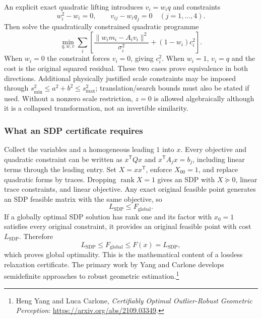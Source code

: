 \documentclass[11pt,a4paper]{article}
\numberwithin{equation}{section}
\begin{document}
An explicit exact quadratic lifting introduces $v_i=w_iq$ and constraints
\begin{equation}
 w_i^2-w_i=0,\qquad v_{ij}-w_iq_j=0\quad(j=1,\ldots,4).
\end{equation}
Then solve the quadratically constrained quadratic programme
\begin{equation}
 \min_{q,w,v}\sum_i\left[
  \frac{\|w_im_i-A_iv_i\|^2}{\sigma_i^2}+(1-w_i)c_i^2\right].
 \label{eq:lifted-TLS}
\end{equation}
When $w_i=0$ the constraint forces $v_i=0$, giving $c_i^2$.
When $w_i=1$, $v_i=q$ and the cost is the original squared residual.
These two cases prove equivalence in both directions. Additional
physically justified scale constraints may be imposed through
$s_{\min}^2\leq a^2+b^2\leq s_{\max}^2$; translation/search bounds
must also be stated if used. Without a nonzero scale restriction,
$z=0$ is allowed algebraically although it is a collapsed transformation,
not an invertible similarity.

\subsubsection{What an SDP certificate requires}

Collect the variables and a homogeneous leading $1$ into $x$.
Every objective and quadratic constraint can be written as
$x^{\mathsf T}Qx$ and $x^{\mathsf T}A_jx=b_j$, including linear terms
through the leading entry. Set $X=xx^{\mathsf T}$, enforce
$X_{00}=1$, and replace quadratic forms by traces. Dropping
$\operatorname{rank}X=1$ gives an SDP with $X\succeq0$, linear
trace constraints, and linear objective. Any exact original feasible
point generates an SDP feasible matrix with the same objective, so
\begin{equation}
 L_{\mathrm{SDP}}\leq F_{\mathrm{global}}.
\end{equation}
If a globally optimal SDP solution has rank one and its factor with
$x_0=1$ satisfies every original constraint, it provides an original
feasible point with cost $L_{\mathrm{SDP}}$. Therefore
\begin{equation}
 L_{\mathrm{SDP}}\leq F_{\mathrm{global}}\leq F(x)=L_{\mathrm{SDP}},
\end{equation}
which proves global optimality. This is the mathematical content of a
lossless relaxation certificate. The primary work by Yang and Carlone
develops semidefinite approaches to robust geometric estimation.\footnote{
Heng Yang and Luca Carlone, \emph{Certifiably Optimal Outlier-Robust
Geometric Perception}: \url{https://arxiv.org/abs/2109.03349}.}
\end{document}

